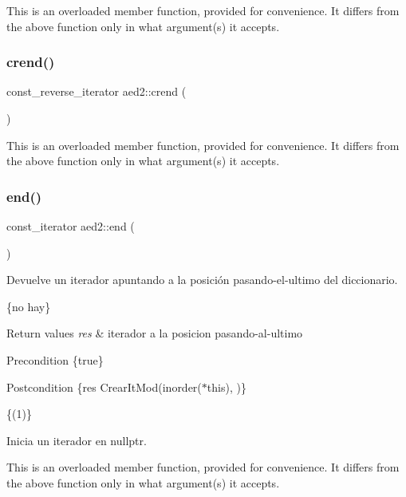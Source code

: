 This is an overloaded member function, provided for convenience. It differs from the above function only in what argument(s) it accepts. \mbox{\label{namespaceaed2_a3f4649ed2b93f1fdb07419fa1de0bf7f}} 
\subsubsection{\texorpdfstring{crend()}{crend()}}
{\footnotesize\ttfamily const\+\_\+reverse\+\_\+iterator aed2\+::crend (\begin{DoxyParamCaption}{ }\end{DoxyParamCaption})}

This is an overloaded member function, provided for convenience. It differs from the above function only in what argument(s) it accepts. \mbox{\label{namespaceaed2_a3a9c18730be5c97fa5eafebd3aef61ed}} 
\subsubsection{\texorpdfstring{end()}{end()}}
{\footnotesize\ttfamily const\+\_\+iterator aed2\+::end (\begin{DoxyParamCaption}{ }\end{DoxyParamCaption})}



Devuelve un iterador apuntando a la posición pasando-\/el-\/ultimo del diccionario. 

\{no hay\}


\begin{DoxyRetVals}{Return values}
{\em res} & iterador a la posicion pasando-\/al-\/ultimo\\
\hline
\end{DoxyRetVals}
\begin{DoxyPrecond}{Precondition}
\{true\} 
\end{DoxyPrecond}
\begin{DoxyPostcond}{Postcondition}
\{res  Crear\+It\+Mod(inorder($\ast$this),  )\}
\end{DoxyPostcond}
\{(1)\}

Inicia un iterador en nullptr.

This is an overloaded member function, provided for convenience. It differs from the above function only in what argument(s) it accepts. \mbox{\label{namespaceaed2_af94e184e6463abb6f7f5237afd0d808a}} 
